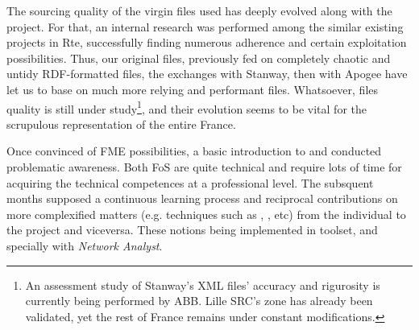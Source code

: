 The sourcing quality of the virgin files used has deeply evolved along with the project. For that, an internal research was performed among the similar existing projects in Rte, successfully finding numerous adherence and certain exploitation possibilities. Thus, our original files, previously fed on completely chaotic and untidy RDF-formatted files, the exchanges with Stanway, then with Apogee have let us to base on much more relying and performant files. Whatsoever, files quality is still under study\footnote{An assessment study of Stanway's XML files' accuracy and rigurosity is currently being performed by ABB. Lille SRC's zone has already been validated, yet the rest of France remains under constant modifications.}, and  their evolution seems to be vital for the scrupulous representation of the entire France.

Once convinced of FME possibilities, a basic introduction to  and  conducted problematic awareness. Both FoS are quite technical and require lots of time for acquiring the technical competences at a professional level. The subsquent months supposed a continuous learning process and reciprocal contributions on more complexified matters (e.g.  techniques such as , , etc) from the individual to the project  and viceversa. These notions being implemented in  toolset, and specially with \textit{Network Analyst}.


